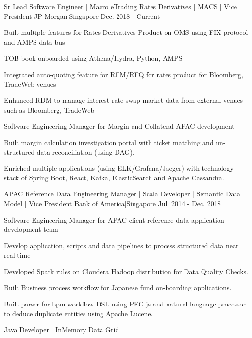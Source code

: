 \begin{cventries}
    {Sr Lead Software Engineer | Macro eTrading Rates Derivatives | MACS | Vice President }
    {JP Morgan|Singapore}
    {Dec. 2018 - Current}
    {
      \begin{cvitems}
        \item {Built multiple features for Rates Derivatives Product on OMS using FIX protocol and AMPS data bus}
        \item {TOB book onboarded using Athena/Hydra, Python, AMPS}
        \item {Integrated auto-quoting feature for RFM/RFQ for rates product for Bloomberg, TradeWeb venues}
        \item {Enhanced RDM to manage interest rate swap market data from external venues such as Bloomberg, TradeWeb}
        \item {Software Engineering Manager for Margin and Collateral APAC development}
        \item {Built margin calculation investigation portal with ticket matching and un-structured data reconciliation (using DAG).}
        \item {Enriched multiple applications (using ELK/Grafana/Jaeger) with technology stack of Spring Boot, React, Kafka, ElasticSearch and Apache Cassandra.}
      \end{cvitems}
    }
    {APAC Reference Data Engineering Manager | Scala Developer | Semantic Data Model | Vice President}
    {Bank of America|Singapore}
    {Jul. 2014 - Dec. 2018}
    {
      \begin{cvitems}
        \item {Software Engineering Manager for APAC client reference data application development team}
        \item {Develop application, scripts and data pipelines to process structured data near real-time}
        \item {Developed Spark rules on Cloudera Hadoop distribution for Data Quality Checks.}
        \item {Built Business process workflow for Japanese fund on-boarding applications.}
        \item {Built parser for bpm workflow DSL using PEG.js and natural language processor to deduce duplicate entities using Apache Lucene.}
      \end{cvitems}
    }
    {Java Developer | InMemory Data Grid}

\end{cventries}
